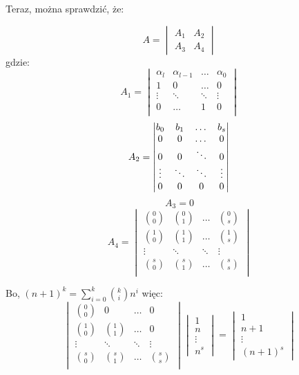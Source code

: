 \documentclass[a4paper]{article}
\begin{document}
Teraz, można sprawdzić, że:

$$A=\begin{vmatrix}
A_1 & A_2\\
A_3 & A_4
\end{vmatrix} $$
gdzie:
$$A_1=\begin{vmatrix}
\alpha_l & \alpha_{l-1} & \dots & \alpha_0\\
1 & 0& \dots & 0\\
\vdots &\ddots & \ddots & \vdots\\
0 & \dots & 1 & 0\\

\end{vmatrix}$$ 
$$A_2=\begin{vmatrix}
b_0 & b_1 & \dots & b_s\\
0 & 0 & \dots & 0\\
0 & 0 & \ddots & 0\\
\vdots & \ddots & \ddots & \vdots\\
0 & 0 & 0 & 0
\end{vmatrix} \\ $$
$$A_3=0$$
$$A_4=\begin{vmatrix}
{0 \choose 0} & {0 \choose 1} & \dots & {0 \choose s}\\
{1 \choose 0} & {1 \choose 1} & \dots & {1 \choose s}\\
\vdots & \ddots & \ddots & \vdots\\
{s \choose 0} & {s \choose 1} & \dots & {s \choose s}\\
\end{vmatrix}$$ 

Bo, $(n+1)^k = \sum\limits_{i=0}^k {k \choose i} n^i$ więc:
$$\begin{vmatrix}
{0 \choose 0} & 0 & \dots & 0\\
{1 \choose 0} & {1 \choose 1} & \dots & 0\\
\vdots & \ddots & \ddots & \vdots\\
{s \choose 0} & {s \choose 1} & \dots & {s \choose s}\\
\end{vmatrix} \begin{vmatrix}
1\\
n\\
\vdots\\
n^s
\end{vmatrix} = \begin{vmatrix}
1\\
n+1\\
\vdots\\
(n+1)^s
\end{vmatrix}$$
\end{document}
